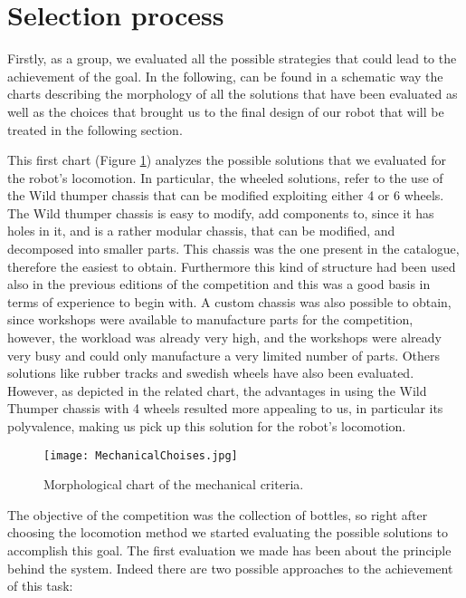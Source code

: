 \section{Selection process}


Firstly, as a group, we evaluated all the possible strategies that could lead to the achievement of the goal.
In the following, can be found in a schematic way the charts describing the morphology of all the solutions that have been evaluated as well as the choices that brought us to the final design of our robot that will be treated in the following section.

This first chart (Figure \ref{fig:MechanicalChoices}) analyzes the possible solutions that we evaluated for the robot's locomotion. In particular, the wheeled solutions, refer to the use of the Wild thumper chassis that can be modified exploiting either 4 or 6 wheels. The Wild thumper chassis is easy to modify, add components to, since it has holes in it, and is a rather modular chassis, that can be modified, and decomposed into smaller parts. This chassis was the one present in the catalogue, therefore the easiest to obtain. Furthermore this kind of structure had been used also in the previous editions of the competition and this was a good basis in terms of experience to begin with. A custom chassis was also possible to obtain, since workshops were available to manufacture parts for the competition, however, the workload was already very high, and the workshops were already very busy and could only manufacture a very limited number of parts.
Others solutions like rubber tracks and swedish wheels have also been evaluated. However, as depicted in the related chart, the advantages in using the Wild Thumper chassis with 4 wheels resulted more appealing to us, in particular its polyvalence, making us pick up this solution for the robot’s locomotion.

\begin{figure}[H]
 \centering
 \texttt{[image: MechanicalChoises.jpg]}
 \caption{Morphological chart of the mechanical criteria.}
\label{fig:MechanicalChoices}
\end{figure}

The objective of the competition was the collection of bottles, so right after choosing the locomotion method we started evaluating the possible solutions to accomplish this goal.
The first evaluation we made has been about the principle behind the system.
Indeed there are two possible approaches to the achievement of this task:

